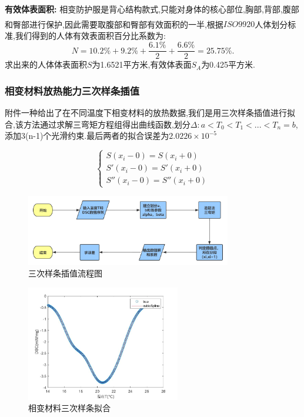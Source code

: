 \documentclass{whutmod}
\newcommand{\upcite}[1]{\textsuperscript{\textsuperscript{\cite{#1}}}}
\begin{document}
\textbf{有效体表面积:}
相变防护服是背心结构款式,只能对身体的核心部位,胸部,背部,腹部和臀部进行保护,因此需要取腹部和臀部有效面积的一半,根据$ISO9920$\upcite{bib:four}人体划分标准,我们得到的人体有效表面积百分比系数为:
\begin{equation}
N=10.2\%+9.2\%+\frac{6.1\%}{2}+\frac{6.6\%}{2}=25.75\%.
\end{equation}
求出来的人体体表面积$S$为1.6521平方米,有效体表面$S_{A}$为0.425平方米.

\subsubsection{相变材料放热能力三次样条插值}
附件一种给出了在不同温度下相变材料的放热数据,我们是用三次样条插值进行拟合,该方法通过求解三弯矩方程组得出曲线函数,划分$\Delta: a<T_0<T_1<...<T_n=b$,添加3(n-1)个光滑约束.最后两者的拟合误差为$2.0226\times 10^{-5}$

\begin{equation}
\left\{
\begin{array}{l}
	S(x_i-0)=S(x_i+0) \\
S'(x_i-0)=S'(x_i+0) \\
S''(x_i-0)=S''(x_i+0) 
\end{array} \right.
\end{equation}
\begin{figure}[!htbp]
	\centering
	\includegraphics[width=0.8\textwidth]{3ci2.png}
	\caption{三次样条插值流程图}
\end{figure}

\begin{figure}[!htbp]
	\centering
	\includegraphics[width=0.6\textwidth]{out.jpg}
	\caption{相变材料三次样条拟合}
\end{figure}
\end{document}
